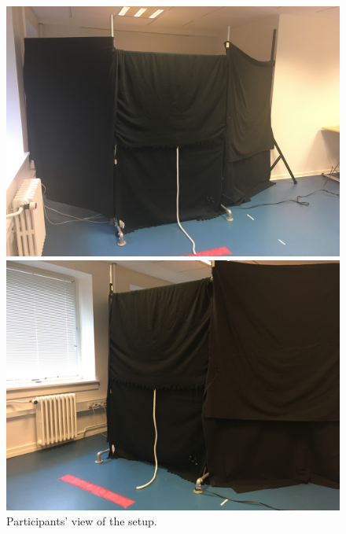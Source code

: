\begin{figure}[h]
  \centering
  \hfill
  \begin{minipage}[b]{0.4\textwidth}
    \includegraphics[width=\textwidth]{Images/setup1.JPG}
  \end{minipage}
  \hfill
  \begin{minipage}[b]{0.4\textwidth}
    \includegraphics[width=\textwidth]{Images/setup2.JPG}
  \end{minipage}
  \hfill
     \caption{Participants' view of the setup.}
     \label{fig:setupBlack}
\end{figure}

